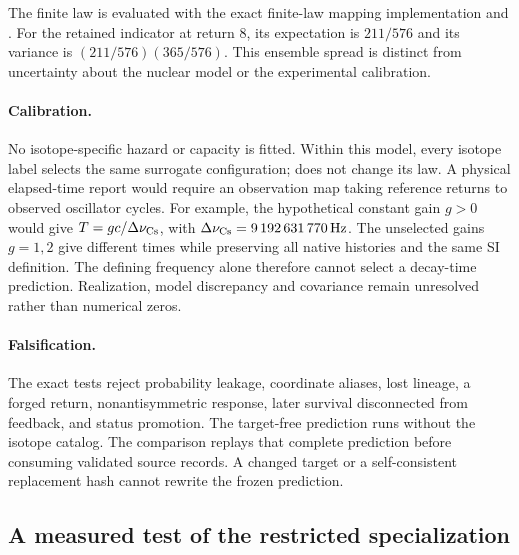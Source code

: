The finite law is evaluated with the exact finite-law mapping implementation and
. For the retained indicator at return 8, its expectation
is \(211/576\) and its variance is \((211/576)(365/576)\). This ensemble spread is
distinct from uncertainty about the nuclear model or the experimental calibration.

\paragraph{Calibration.}
No isotope-specific hazard or capacity is fitted. Within this model, every isotope label selects
the same surrogate configuration;  does not change
its law. A physical elapsed-time report would require an observation map taking reference
returns to observed oscillator cycles. For example, the hypothetical constant gain
\(g>0\) would give \(T=gc/\Delta\nu_{\rm Cs}\), with
\(\Delta\nu_{\rm Cs}=9\,192\,631\,770\,\mathrm{Hz}\). The unselected gains \(g=1,2\)
give different times while preserving all native histories and the same SI definition.
The defining frequency alone therefore cannot select a decay-time prediction. Realization,
model discrepancy and covariance remain unresolved rather than numerical zeros.

\paragraph{Falsification.}
The exact tests reject probability leakage, coordinate aliases, lost lineage, a forged
return, nonantisymmetric response, later survival disconnected from feedback, and status
promotion. The target-free prediction runs without the isotope catalog. The comparison
replays that complete prediction before consuming validated source records. A changed
target or a self-consistent replacement hash cannot rewrite the frozen prediction.


\subsection{A measured test of the restricted specialization}
